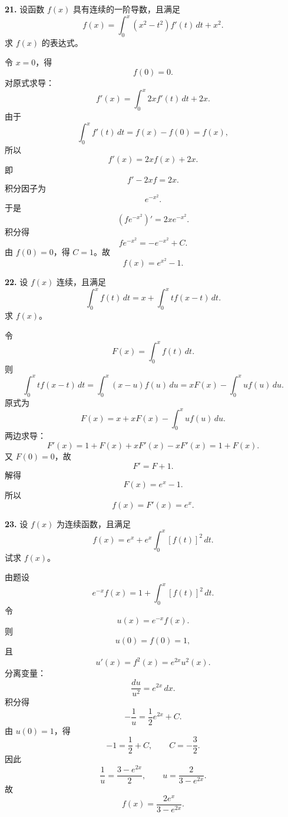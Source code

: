 \begin{problemblock}
\textbf{21.} 设函数 \(f(x)\) 具有连续的一阶导数，且满足
\[
f(x)=\int_0^x(x^2-t^2)f'(t)\,dt+x^2.
\]
求 \(f(x)\) 的表达式。
\end{problemblock}

\begin{solutionblock}
令 \(x=0\)，得
\[
f(0)=0.
\]
对原式求导：
\[
f'(x)=\int_0^x2x f'(t)\,dt+2x.
\]
由于
\[
\int_0^x f'(t)\,dt=f(x)-f(0)=f(x),
\]
所以
\[
f'(x)=2xf(x)+2x.
\]
即
\[
f'-2xf=2x.
\]
积分因子为
\[
e^{-x^2}.
\]
于是
\[
(fe^{-x^2})'=2xe^{-x^2}.
\]
积分得
\[
fe^{-x^2}=-e^{-x^2}+C.
\]
由 \(f(0)=0\)，得 \(C=1\)。故
\[
\boxed{f(x)=e^{x^2}-1}.
\]
\end{solutionblock}

\begin{problemblock}
\textbf{22.} 设 \(f(x)\) 连续，且满足
\[
\int_0^x f(t)\,dt=x+\int_0^x t f(x-t)\,dt.
\]
求 \(f(x)\)。
\end{problemblock}

\begin{solutionblock}
令
\[
F(x)=\int_0^xf(t)\,dt.
\]
则
\[
\int_0^x t f(x-t)\,dt
=\int_0^x (x-u)f(u)\,du
=xF(x)-\int_0^x u f(u)\,du.
\]
原式为
\[
F(x)=x+xF(x)-\int_0^x u f(u)\,du.
\]
两边求导：
\[
F'(x)=1+F(x)+xF'(x)-xF'(x)=1+F(x).
\]
又 \(F(0)=0\)，故
\[
F'=F+1.
\]
解得
\[
F(x)=e^x-1.
\]
所以
\[
\boxed{f(x)=F'(x)=e^x}.
\]
\end{solutionblock}

\begin{problemblock}
\textbf{23.} 设 \(f(x)\) 为连续函数，且满足
\[
f(x)=e^x+e^x\int_0^x[f(t)]^2\,dt.
\]
试求 \(f(x)\)。
\end{problemblock}

\begin{solutionblock}
由题设
\[
e^{-x}f(x)=1+\int_0^x[f(t)]^2\,dt.
\]
令
\[
u(x)=e^{-x}f(x).
\]
则
\[
u(0)=f(0)=1,
\]
且
\[
u'(x)=f^2(x)=e^{2x}u^2(x).
\]
分离变量：
\[
\frac{du}{u^2}=e^{2x}\,dx.
\]
积分得
\[
-\frac1u=\frac12e^{2x}+C.
\]
由 \(u(0)=1\)，得
\[
-1=\frac12+C,\qquad C=-\frac32.
\]
因此
\[
\frac1u=\frac{3-e^{2x}}{2},
\qquad
u=\frac{2}{3-e^{2x}}.
\]
故
\[
\boxed{f(x)=\frac{2e^x}{3-e^{2x}}}.
\]
\end{solutionblock}

